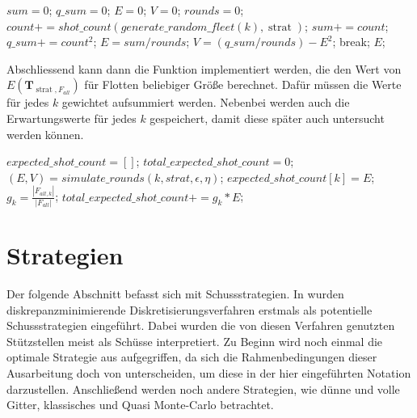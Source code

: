 \documentclass[a4paper,12pt]{llncs}
\numberwithin{equation}{section}
\DeclareMathOperator{\strat}{strat}
\begin{document}
\begin{tcolorbox}
	\begin{algorithmic}[H]
		\Function{simulate\_rounds}{$k, \strat, \epsilon, \eta$}{:}
		\State $sum=0$;
		\State $q\_sum=0$;
		\State $E=0$;
		\State $V=0$;
		\State $rounds =0$;
		\State $count += shot\_count(generate\_random\_fleet(k), \strat)$;
		\State $sum += count$; 
		\State $q\_sum += {count}^2$;
		\State $E =sum / rounds$;
		\State $V =(q\_sum / rounds) - E^2$;
		\State	break;
		\EndIf
		\EndWhile
		\State\Return $E$;
		\EndFunction
	\end{algorithmic}
\end{tcolorbox}


Abschliessend kann dann die Funktion implementiert werden, die den Wert von $E(\mathbf{T}_{\strat,F_{all}})$ für Flotten beliebiger Größe berechnet. Dafür müssen die Werte für jedes $k$ gewichtet aufsummiert werden. Nebenbei werden auch die Erwartungswerte für jedes $k$ gespeichert, damit diese später auch untersucht werden können.

\begin{tcolorbox}
\begin{algorithmic}[H]
	\State $expected\_shot\_count=[]$;
	\State $total\_expected\_shot\_count=0$;
	\State $(E,V)=simulate\_rounds(k, strat, \epsilon, \eta)$;
	\State $expected\_shot\_count[k] = E$;
	\State $g_k=\frac{|F_{all,k}|}{|F_{all}|}$;
	\State $total\_expected\_shot\_count+=g_k * E$;
	\EndFor
	\EndFunction
\end{algorithmic}
\end{tcolorbox}


\section{Strategien}

Der folgende Abschnitt befasst sich mit Schussstrategien. In \cite{M13} wurden diskrepanzminimierende Diskretisierungsverfahren erstmals als potentielle Schussstrategien eingeführt. Dabei wurden die von diesen Verfahren genutzten Stützstellen meist als Schüsse interpretiert. Zu Beginn wird noch einmal die optimale Strategie aus \cite{M13} aufgegriffen, da sich die Rahmenbedingungen dieser Ausarbeitung doch von \cite{M13} unterscheiden, um diese in der hier eingeführten Notation darzustellen. Anschließend werden noch andere Strategien, wie dünne und volle Gitter, klassisches und Quasi Monte-Carlo betrachtet. 
\end{document}
